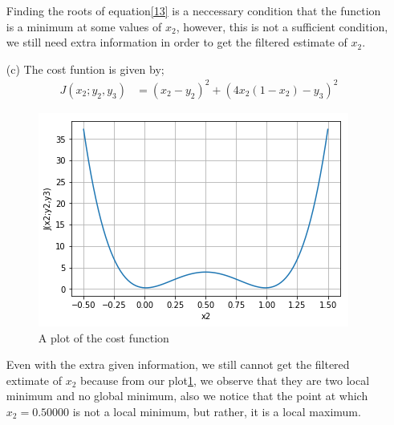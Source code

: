 \documentclass[12pt,a4paper]{article}
\begin{document}
\begin{itemize}
Finding the roots of equation\ref{13} is a neccessary condition that the function is a minimum at some values of $x_{2}$, however, this is not a sufficient condition, we still need extra information in order to get the filtered estimate of  $x_{2}$.
\item[(c)]
The cost funtion is given by;
\begin{align*}
J(x_{2};y_{2},y_{3})&=\left(x_{2}-y_{2}\right)^{2}+\left(4x_{2}\left(1-x_{2}\right)-y_{3}\right)^{2} \label{16}
\end{align*}
\begin{figure}[h!]
	\centering
	\includegraphics[scale=0.5]{index1.png}
	\caption{A plot of the cost function} \label{15}
\end{figure}

Even with the extra given information, we still cannot get the filtered extimate of $x_{2}$ because from our plot\ref{15}, we observe that they are two local minimum and no global minimum, also we notice that the point at which $x_{2}=0.50000$ is not a local minimum, but rather, it is a local maximum.
\end{itemize}
\newpage
\end{document}

